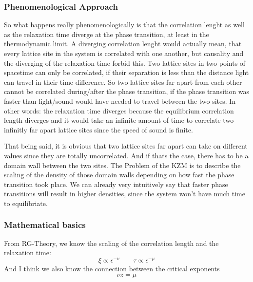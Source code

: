 	\subsubsection{Phenomenological Approach}
	So what happens really phenomenologically is that the correlation lenght as well as the relaxation time diverge at the phase transition, at least in the thermodynamic limit. A diverging correlation lenght would actually mean, that every lattice site in the system is correlated with one another, but causality and the diverging of the relaxation time forbid this. Two lattice sites in two points of spacetime can only be correlated, if their separation is less than the distance light can travel in their time difference. So two lattice sites far apart from each other cannot be correlated during/after the phase transition, if the phase transition was faster than light/sound would have needed to travel between the two sites. In other words: the relaxation time diverges because the equilibrium correlation length diverges and it would take an infinite amount of time to correlate two infinitly far apart lattice sites since the speed of sound is finite.
	
	That being said, it is obvious that two lattice sites far apart can take on different values since they are totally uncorrelated. And if thats the case, there has to be a domain wall between the two sites. The Problem of the KZM is to describe the scaling of the density of those domain walls depending on how fast the phase transition took place. We can already very intuitively say that faster phase transitions will result in higher densities, since the system won't have much time to equilibriate.
	
	\subsubsection{Mathematical basics}
	From RG-Theory, we know the scaling of the correlation length and the relaxation time:
	\begin{equation}
		\xi \propto \epsilon^{-\nu} \qquad \tau \propto \epsilon^{-\mu}
	\end{equation}
	And I think we also know the connection between the critical exponents \cite{goldenfeld2018lectures}
	\begin{equation}
		\nu z = \mu
	\end{equation}
	
